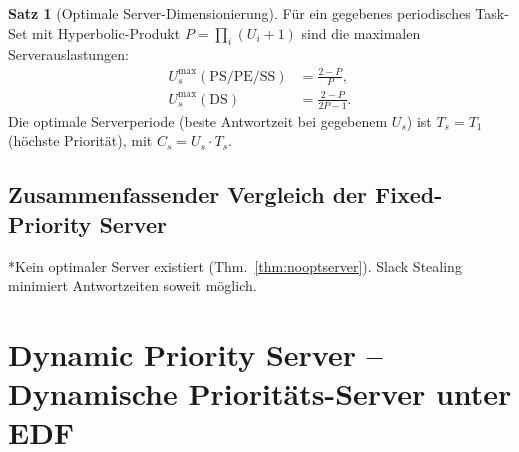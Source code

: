 ﻿\documentclass[a4paper,12pt]{report}
\theoremstyle{definition}
\newtheorem{satz}{Satz}[chapter]
\begin{document}
\begin{satz}[Optimale Server-Dimensionierung]
	Für ein gegebenes periodisches Task-Set mit Hyperbolic-Produkt $P = \prod_i(U_i+1)$
	sind die maximalen Serverauslastungen:
	\begin{align*}
		U_s^{\max}(\text{PS/PE/SS}) &= \frac{2-P}{P}, \\
		U_s^{\max}(\text{DS}) &= \frac{2-P}{2P-1}.
	\end{align*}
	Die optimale Serverperiode (beste Antwortzeit bei gegebenem $U_s$) ist
	$T_s = T_1$ (höchste Priorität), mit $C_s = U_s \cdot T_s$.
\end{satz}

\section{Zusammenfassender Vergleich der Fixed-Priority Server}

\begin{table}[H]
	\centering
	\caption{Vergleich der Fixed-Priority Server -- Vollständige Übersicht}

	\smallskip
	\noindent\small{*Kein optimaler Server existiert (Thm.~\ref{thm:nooptserver}).
	Slack Stealing minimiert Antwortzeiten soweit möglich.}
\end{table}

\chapter{Dynamic Priority Server -- Dynamische Prioritäts-Server unter EDF}
\label{chap:dynserver}
\end{document}
